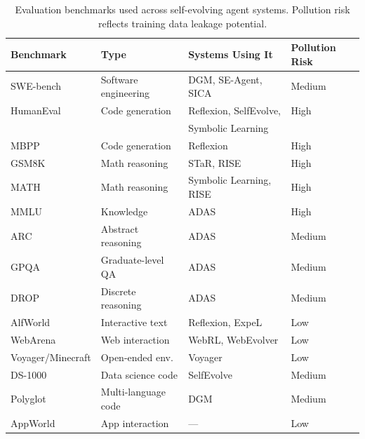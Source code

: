 \begin{table}[t]
\centering
\caption{Evaluation benchmarks used across self-evolving agent systems. Pollution risk reflects training data leakage potential.}
\label{tab:bench-eval}
\begin{tabular}{@{}llll@{}}
\toprule
\textbf{Benchmark} & \textbf{Type} & \textbf{Systems Using It} & \textbf{Pollution Risk} \\
\midrule
SWE-bench & Software engineering & DGM, SE-Agent, SICA & Medium \\
HumanEval & Code generation & Reflexion, SelfEvolve, & High \\
 & & Symbolic Learning & \\
MBPP & Code generation & Reflexion & High \\
GSM8K & Math reasoning & STaR, RISE & High \\
MATH & Math reasoning & Symbolic Learning, RISE & High \\
MMLU & Knowledge & ADAS & High \\
ARC & Abstract reasoning & ADAS & Medium \\
GPQA & Graduate-level QA & ADAS & Medium \\
DROP & Discrete reasoning & ADAS & Medium \\
AlfWorld & Interactive text & Reflexion, ExpeL & Low \\
WebArena & Web interaction & WebRL, WebEvolver & Low \\
Voyager/Minecraft & Open-ended env. & Voyager & Low \\
DS-1000 & Data science code & SelfEvolve & Medium \\
Polyglot & Multi-language code & DGM & Medium \\
AppWorld & App interaction & --- & Low \\
\bottomrule
\end{tabular}
\end{table}


